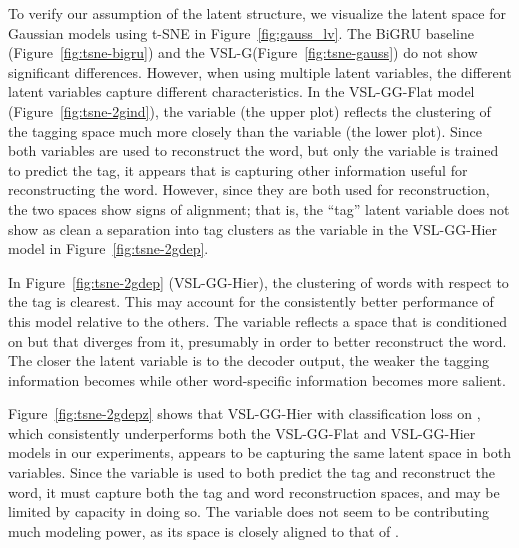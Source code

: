\documentclass[11pt,a4paper]{article}
\newcommand{\vsmg}{VSL-G\xspace}
\newcommand{\vsmggflat}{VSL-GG-Flat\xspace}
\newcommand{\vsmgghier}{VSL-GG-Hier\xspace}
\begin{document}
To verify our assumption of the latent structure, we visualize the latent space for Gaussian models using t-SNE \cite{maaten2008visualizing} in Figure~\ref{fig:gauss_lv}. The BiGRU baseline (Figure~\ref{fig:tsne-bigru}) and the \vsmg (Figure~\ref{fig:tsne-gauss}) do not show significant differences. However, when using multiple latent variables, the different latent variables capture different characteristics. In the \vsmggflat model (Figure~\ref{fig:tsne-2gind}), the  variable (the upper plot) reflects the clustering of the tagging space much more closely than the  variable (the lower plot). Since both variables are used to reconstruct the word, but only the  variable is trained to predict the tag, it appears that  is capturing other information useful for reconstructing the word.
However, since they are both used for reconstruction, the two spaces show signs of alignment; that is, the ``tag'' latent variable  does not show as clean a separation into tag clusters as the  variable in the \vsmgghier model in Figure~\ref{fig:tsne-2gdep}.

In Figure~\ref{fig:tsne-2gdep} (\vsmgghier), the clustering of words with respect to the tag is clearest.
This may account for the consistently better performance of this model relative to the others. The  variable reflects a space that is conditioned on 
but that diverges from it, presumably in order to better reconstruct the word.
The closer the latent variable is to the decoder output, the weaker the tagging information becomes while other word-specific information becomes more salient.

Figure~\ref{fig:tsne-2gdepz} shows that \vsmgghier with classification loss on , which consistently underperforms both the \vsmggflat and \vsmgghier models in our experiments, appears to be capturing the same latent space in both variables. Since the  variable is used to both predict the tag and reconstruct the word, it must capture both the tag and word reconstruction spaces, and may be limited by capacity in doing so. The  variable does not seem to be contributing much modeling power, as its space is closely aligned to that of .
\end{document}
